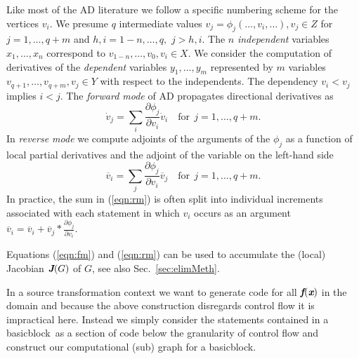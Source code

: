 \documentclass{book}
\newcommand{\basicblock}{basicblock}
\newcommand{\bmf}{\mbox{\bf\em f}}
\newcommand{\bmJ}{\mbox{\bf\em J}}
\newcommand{\bmx}{\mbox{\bf\em x}}
\newcommand{\refsec}[1]{{Sec.~\ref{#1}}}
\newcommand{\refeqn}[1]{{(\ref{#1})}}
\begin{document}
Like most of the AD literature we follow a specific numbering scheme for the vertices $v_i$.
We presume $q$ intermediate values
$v_j = \phi_j(\ldots,v_i,\ldots), v_j\in Z$
for $j=1,\ldots,q+m$ and $h,i=1-n,\ldots,q,$ $j>h,i$. 
The $n$ {\em independent}
variables $x_1,\ldots,x_n$ correspond to 
$v_{1-n},\ldots,v_0, v_i\in X$. 
We consider the 
computation of derivatives of the {\em dependent} variables 
$y_1,\ldots,y_m$ represented by $m$ variables $v_{q+1},\ldots,v_{q+m}, v_j\in Y$
with respect to the independents. 
The dependency $v_i<v_j$ implies $i<j$. 
The {\em forward mode} of AD propagates directional derivatives
as 
\begin{equation} \label{eqn:fm}
  \dot{v}_j= \sum\limits_i\frac{\partial \phi_j}{\partial v_i}\dot{v}_i 
  \quad \text{for}~~j=1,\ldots,q+m.
\end{equation} 
In {\em reverse mode} we compute adjoints of the arguments of the $\phi_j$
as a function of local partial derivatives and the 
adjoint of the variable on the left-hand side
\begin{equation} \label{eqn:rm}
  \overline{v}_i= \sum\limits_j\frac{\partial \phi_j}{\partial v_i}\overline{v}_j 
  \quad \text{for}~~j=1,\ldots,q+m.
\end{equation} 
In practice, the sum in \refeqn{eqn:rm} is often split into individual increments 
associated with each statement in which $v_i$ occurs as an argument 
$\overline{v}_i=\overline{v}_i+\overline{v}_j * \frac{\partial \phi_j}{\partial v_i}$.

Equations \refeqn{eqn:fm} and \refeqn{eqn:rm} can be used to accumulate 
the (local) Jacobian $\bmJ(G)$
of $G$, see also \refsec{sec:elimMeth}. 

In a source transformation context we want to generate code for all $\bmf(\bmx)$
in the domain and because the above construction disregards control flow it is 
impractical here. Instead we simply consider the statements contained in a 
\basicblock\  as a section of code below the granularity of control flow and 
construct our computational (sub) graph for a \basicblock.   

\end{document}
